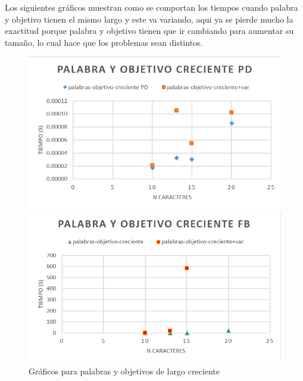 Los siguientes gráficos muestran como se comportan los tiempos cuando palabra y objetivo tienen el mismo largo y este va variando, aqui ya se pierde mucho la exactitud porque palabra y objetivo tienen que ir cambiando para aumentar su tamaño, lo cual hace que los problemas sean distintos.

\begin{figure}[H]
    \centering
    \begin{minipage}[t]{0.5\textwidth}
        \includegraphics[width=\textwidth]{images/po-credientes-pd.png}
    \end{minipage}%
    \begin{minipage}[t]{0.5\textwidth}
        \includegraphics[width=\textwidth]{images/po-credientes-fb.png}    \end{minipage}%
    \caption{Gráficos para palabras y objetivos de largo creciente}
    \label{fig:POcreciente}
\end{figure} 

